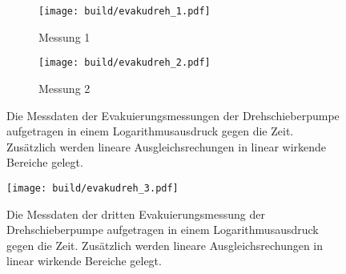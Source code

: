     \begin{figure}[h]
      \begin{subfigure}{0.48\textwidth}
        \centering
        \texttt{[image: build/evakudreh\_1.pdf]}
        \caption{Messung 1}
        \label{fig:dreh_eva_1}
      \end{subfigure}
      \hfill
      \begin{subfigure}{0.48\textwidth}
        \centering
        \texttt{[image: build/evakudreh\_2.pdf]}
        \caption{Messung 2}
        \label{fig:dreh_eva_2}
      \end{subfigure}
      \caption{Die Messdaten der Evakuierungsmessungen der Drehschieberpumpe aufgetragen in einem Logarithmusausdruck gegen die Zeit. 
      Zusätzlich werden lineare Ausgleichsrechungen in linear wirkende Bereiche gelegt.}
      \label{fig:dreh_eva_1_2}
    \end{figure}



    \begin{figure}[h]
      \centering
      \texttt{[image: build/evakudreh\_3.pdf]}
      \caption{Die Messdaten der dritten Evakuierungsmessung der Drehschieberpumpe aufgetragen in einem Logarithmusausdruck gegen die Zeit. Zusätzlich werden lineare Ausgleichsrechungen in linear wirkende Bereiche gelegt.}
      \label{fig:evaku_dreh_3}
    \end{figure}


